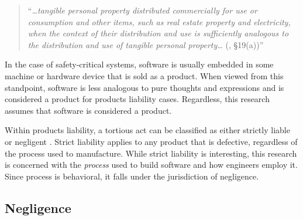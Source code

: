 \documentclass[12pt]{report}
\begin{document}
\begin{quote}
``\textit{\ldots tangible personal property distributed commercially for use or consumption and other items, such as real estate property and electricity, when the context of their distribution and use is sufficiently analogous to the distribution and use of tangible personal property\ldots} (\cite{Rest3d}, \S19(a))'' 
\end{quote}

In the case of safety-critical systems, software is usually embedded in some machine or hardware device \cite{Leveson95} that is sold as a product. When viewed from this standpoint, software is less analogous to pure thoughts and expressions and is considered a product for products liability cases. Regardless, this research assumes that software is considered a product.

Within products liability, a tortious act can be classified as either strictly liable or negligent \cite{Turner99}. Strict liability applies to any product that is defective, regardless of the process used to manufacture. While strict liability is interesting, this research is concerned with the \textit{process} used to build software and how engineers employ it. Since process is behavioral, it falls under the jurisdiction of negligence.

\subsection{Negligence}
\end{document}
